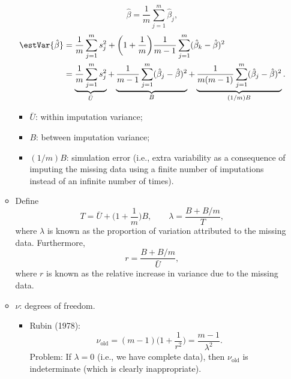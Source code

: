 \begin{enumerate}
\begin{itemize}
                        \[ \hat{\beta}=\frac{1}{m}\sum_{j=1}^{m}\hat{\beta}_j, \]
                        \begin{align*}
                              \estVar{\hat{\beta}}
                               & =\frac{1}{m}\sum_{j=1}^{m}s_j^2+\biggl(1+\frac{1}{m}\biggr)\frac{1}{m-1}\sum_{j=1}^{m}(\hat{\beta}_k-\hat{\beta})^2                                                                                                 \\
                               & =\underbrace{\frac{1}{m}\sum_{j=1}^{m}s_j^2}_{\bar{U}}+\underbrace{\frac{1}{m-1}\sum_{j=1}^{m}(\hat{\beta}_j-\hat{\beta})^2}_{B}+\underbrace{\frac{1}{m(m-1)}\sum_{j=1}^{m}(\hat{\beta}_j-\hat{\beta})^2}_{(1/m)B}.
                        \end{align*}
                        \begin{itemize}
                              \item $ \bar{U} $: within imputation variance;
                              \item $ B $: between imputation variance;
                              \item $ (1/m)B $: simulation error (i.e., extra variability as a consequence of imputing the
                                    missing data using a finite number of imputations instead of an infinite number
                                    of times).
                        \end{itemize}
                  \item Define
                        \[ T = \bar{U}+\biggl(1+\frac{1}{m}\biggr)B,\qquad \lambda=\frac{B+B/m}{T}, \]
                        where $ \lambda $ is known as the proportion of variation attributed to the missing data.
                        Furthermore,
                        \[ r=\frac{B+B/m}{\bar{U}}, \]
                        where $ r $ is known as the relative increase in variance due to the missing data.
                  \item $ \nu $: degrees of freedom.
                        \begin{itemize}
                              \item Rubin (1978):
                                    \[ \nu_{\text{old}}=(m-1)\biggl(1+\frac{1}{r^2}\biggr)=\frac{m-1}{\lambda^2}. \]
                                    Problem: If $ \lambda=0 $ (i.e., we have complete data), then $ \nu_{\text{old}} $ is indeterminate
                                    (which is clearly inappropriate).

\end{itemize}
\end{itemize}
\end{enumerate}
